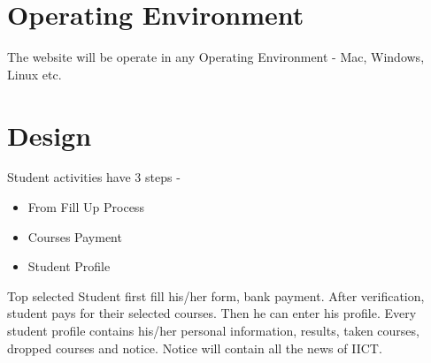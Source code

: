 \documentclass{scrreprt}
\begin{document}
	\section{Operating Environment}
	The website will be operate in any Operating Environment - Mac, Windows, Linux etc. 
	
	\section{Design}
	Student activities have 3 steps -
	\begin{itemize}
		\item From Fill Up Process
		\item Courses Payment
		\item Student Profile
	\end{itemize}
	Top selected Student first fill his/her form, bank payment. After verification, student pays for their selected courses. Then he can enter his profile. 
	\newline
	Every student profile contains his/her personal information, results, taken courses, dropped courses and notice.
	\newline
	Notice will contain all the news of IICT.
	
\end{document}
